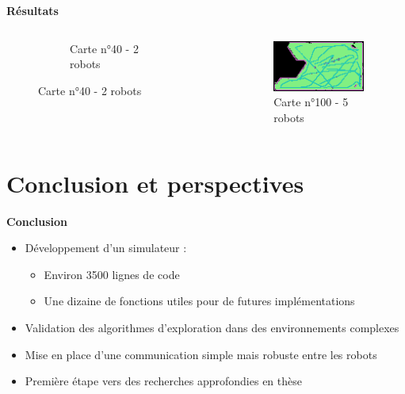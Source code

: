 \documentclass[aspectratio=169,10pt]{beamer}
\begin{document}
\begin{frame}{\textbf{Résultats}}
\begin{columns}
\begin{column}{0.33\textwidth}
\begin{figure}[H]
\begin{subfigure}{0.9\textwidth}
					\caption*{Carte n°40 - 2 robots}
				\end{subfigure}
			\end{figure}
		\end{column}
		\begin{column}{0.33\textwidth}
			\begin{figure}[H]
				\centering
				\includegraphics[width=0.9\textwidth]{IMAGES/map100_explored_5robot.png}
				\caption*{Carte n°100 - 5 robots}
			\end{figure}
		\end{column}
	\end{columns}
\end{frame}

\section{Conclusion et perspectives}
\begin{frame}{\textbf{Conclusion}}
	\begin{itemize}
		\item Développement d'un simulateur :
		\begin{itemize}
			\item Environ 3500 lignes de code
			\item Une dizaine de fonctions utiles pour de futures implémentations
		\end{itemize}
		\vspace{0.2cm} 
		\item Validation des algorithmes d'exploration dans des environnements complexes
		\vspace{0.2cm} 
		\item Mise en place d'une communication simple mais robuste entre les robots
		\vspace{0.2cm} 
		\item Première étape vers des recherches approfondies en thèse
	\end{itemize}

\end{frame}
\end{document}
